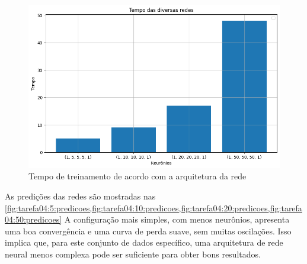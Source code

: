 \begin{figure}[tbh]
	\centering
	\caption{Tempo de treinamento de acordo com a arquitetura da rede}
	\label{fig:tarefa04:tempo}
	\includegraphics[width=0.7\linewidth]{./0803_imgs/png-241110-190809211-3985790047096570638.png}
\end{figure}

As predições das redes são mostradas nas 
\cref{fig:tarefa04:5:predicoes,fig:tarefa04:10:predicoes,fig:tarefa04:20:predicoes,fig:tarefa04:50:predicoes}
A configuração mais simples, com menos neurônios, apresenta uma boa 
convergência e uma curva de perda suave, sem muitas oscilações. Isso 
implica que, para este conjunto de dados específico, uma arquitetura de rede 
neural menos complexa pode ser suficiente para obter bons resultados.



